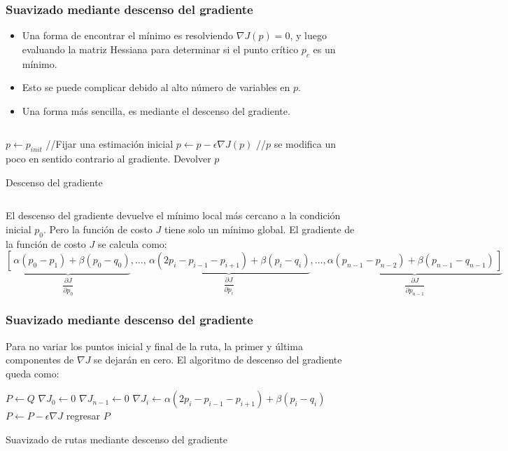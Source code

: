 \documentclass[10pt,spanish,aspectratio=1610]{beamer}
\begin{document}
\begin{frame}\frametitle{Suavizado mediante descenso del gradiente}
  \begin{itemize}
  \item Una forma de encontrar el mínimo es resolviendo $\nabla J(p) = 0$, y luego evaluando la matriz Hessiana para determinar si el punto crítico $p_c$ es un mínimo.
  \item Esto se puede complicar debido al alto número de variables en $p$.
  \item Una forma más sencilla, es mediante el descenso del gradiente.
  \end{itemize}
  \begin{columns}
    \begin{column}{0.7\textwidth}
  \begin{algorithm}[H]
    \footnotesize
  \DontPrintSemicolon
  $p\leftarrow p_{init}$ //Fijar una estimación inicial\;
  {
    $p \leftarrow p - \epsilon \nabla J (p)$ //$p$ se modifica un poco en sentido contrario al gradiente.\;
  }
  Devolver $p$
  \caption{Descenso del gradiente}
\end{algorithm}
\end{column}
\end{columns}
\[\]
El descenso del gradiente devuelve el mínimo local más cercano a la condición inicial $p_0$. Pero la función de costo $J$ tiene solo un mínimo global. El gradiente de la función de costo $J$ se calcula como:
  \[\underbrace{\left[\frac{}{}\alpha(p_0 - p_1)+\beta(p_0 - q_0)\right. }_{\dfrac{\partial J}{\partial p_0}}
,\dots ,
\underbrace{\frac{}{}\alpha(2p_i - p_{i-1} - p_{i+1})+\beta(p_i - q_i)}_{\dfrac{\partial J}{\partial p_i}}
,\dots ,
\underbrace{\left.\alpha(p_{n-1} - p_{n-2})+\beta(p_{n-1}-q_{n-1})\frac{}{}\right]}_{\dfrac{\partial J}{\partial p_{n-1}}}
\]
\end{frame}

\begin{frame}\frametitle{Suavizado mediante descenso del gradiente}
  
  Para no variar los puntos inicial y final de la ruta, la primer y última componentes de $\nabla J$ se dejarán en cero. El algoritmo de descenso del gradiente queda como:
  \[\]
\begin{algorithm}[H]
\DontPrintSemicolon
  \DontPrintSemicolon
  $P \leftarrow Q$\;
  $\nabla J_0 \leftarrow 0$\;
  $\nabla J_{n-1} \leftarrow 0$\;   
  {
    \ForEach{$i \in [1,n-1)$}
    {
      $\nabla J_i \leftarrow \alpha (2p_i - p_{i-1} - p_{i+1}) + \beta (p_i - q_i)$\;
    }
    $P \leftarrow P - \epsilon \nabla J$
  }
  regresar $P$
  \caption{Suavizado de rutas mediante descenso del gradiente}
\end{algorithm}
\end{frame}
\end{document}
